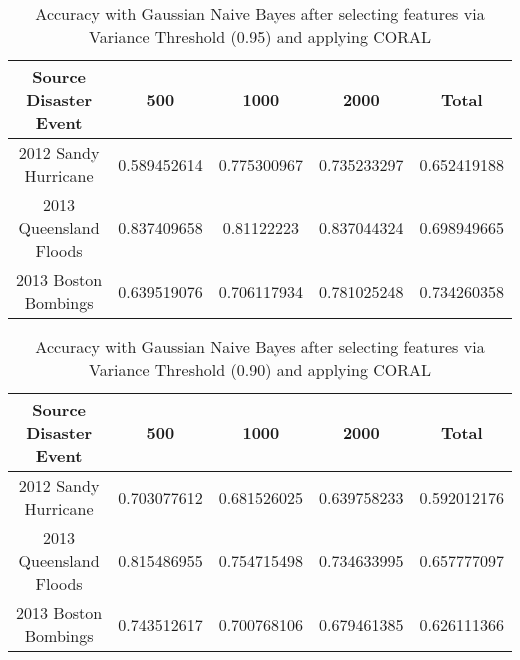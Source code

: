 \begin{table}[ht]
    \begin{center}
    \caption{Accuracy with Gaussian Naive Bayes after selecting features via Variance Threshold (0.95) and applying CORAL}
    \begin{tabular}[c]{|c|c|c|c|c|}
        \hline
        Source Disaster Event & 500 & 1000 & 2000 & Total \\
        \hline
        2012 Sandy Hurricane & 0.589452614 & 0.775300967 & 0.735233297 & 0.652419188 \\
        2013 Queensland Floods & 0.837409658 & 0.81122223 & 0.837044324 & 0.698949665 \\
        2013 Boston Bombings & 0.639519076 & 0.706117934 & 0.781025248 & 0.734260358 \\
        \hline
    \end{tabular}
    \label{tablevar95}
   \end{center}
\end{table}

\begin{table}[ht]
    \begin{center}
    \caption{Accuracy with Gaussian Naive Bayes after selecting features via Variance Threshold (0.90) and applying CORAL}
    \begin{tabular}[c]{|c|c|c|c|c|}
        \hline
        Source Disaster Event & 500 & 1000 & 2000 & Total \\
        \hline
        2012 Sandy Hurricane & 0.703077612 & 0.681526025 & 0.639758233 & 0.592012176 \\
        2013 Queensland Floods & 0.815486955 & 0.754715498 & 0.734633995 & 0.657777097 \\
        2013 Boston Bombings & 0.743512617 & 0.700768106 & 0.679461385 & 0.626111366 \\
        \hline
    \end{tabular}
    \label{tablevar9}
   \end{center}
\end{table}

